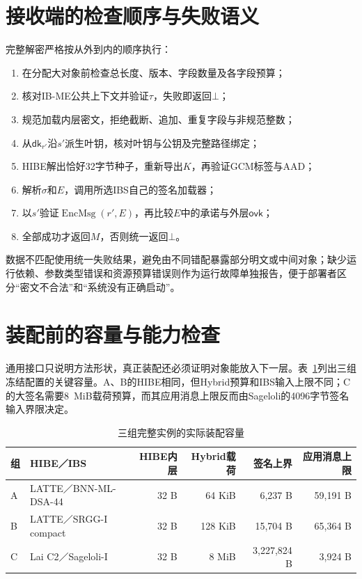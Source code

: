 \documentclass[UTF8,a4paper,12pt,oneside,openany,fontset=fandol]{ctexrep}
\begin{document}
\section{接收端的检查顺序与失败语义}
完整解密严格按从外到内的顺序执行：
\begin{enumerate}
  \item 在分配大对象前检查总长度、版本、字段数量及各字段预算；
  \item 核对IB-ME公共上下文并验证\(\tau\)，失败即返回\(\bot\)；
  \item 规范加载内层密文，拒绝截断、追加、重复字段与非规范整数；
  \item 从\(\mathsf{dk}_{r'}\)沿\(s'\)派生叶钥，核对叶钥与公钥及完整路径绑定；
  \item HIBE解出恰好32字节种子，重新导出\(K\)，再验证GCM标签与AAD；
  \item 解析\(\sigma\)和\(E\)，调用所选IBS自己的签名加载器；
  \item 以\(s'\)验证\(\operatorname{EncMsg}(r',E)\)，再比较\(E\)中的承诺与外层\(\mathsf{ovk}\)；
  \item 全部成功才返回\(M\)，否则统一返回\(\bot\)。
\end{enumerate}
数据不匹配使用统一失败结果，避免由不同错配暴露部分明文或中间对象；缺少运行依赖、参数类型错误和资源预算错误则作为运行故障单独报告，便于部署者区分“密文不合法”和“系统没有正确启动”。

\section{装配前的容量与能力检查}
通用接口只说明方法形状，真正装配还必须证明对象能放入下一层。表~\ref{tab:suite-capacity}列出三组冻结配置的关键容量。A、B的HIBE相同，但Hybrid预算和IBS输入上限不同；C的大签名需要8~MiB载荷预算，而其应用消息上限反而由Sageloli的4096字节签名输入界限决定。

\begin{table}[htbp]
\centering
\small
\caption{三组完整实例的实际装配容量}
\label{tab:suite-capacity}
\begin{tabular}{@{}l>{\raggedright\arraybackslash}p{}rrrr@{}}
\toprule
\rowcolor{black!8} 组 & HIBE／IBS & HIBE内层 & Hybrid载荷 & 签名上界 & 应用消息上限 \\
\midrule
A & LATTE／BNN-ML-DSA-44 & 32 B & 64 KiB & 6,237 B & 59,191 B \\
B & LATTE／SRGG-I compact & 32 B & 128 KiB & 15,704 B & 65,364 B \\
C & Lai C2／Sageloli-I & 32 B & 8 MiB & 3,227,824 B & 3,924 B \\
\bottomrule
\end{tabular}
\end{table}
\end{document}
